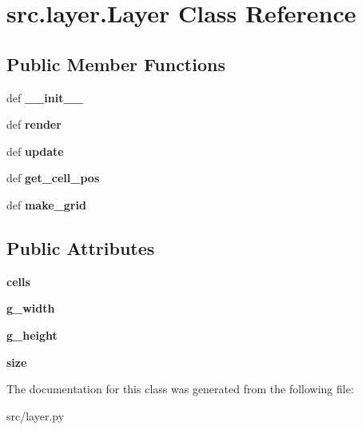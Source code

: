 \hypertarget{classsrc_1_1layer_1_1_layer}{\section{src.\-layer.\-Layer \-Class \-Reference}
\label{classsrc_1_1layer_1_1_layer}
}
\subsection*{\-Public \-Member \-Functions}
\begin{DoxyCompactItemize}
\item 
\hypertarget{classsrc_1_1layer_1_1_layer_a137dd7de61769f9f7f0f0cc57bdb2b00}{def {\bfseries \-\_\-\-\_\-init\-\_\-\-\_\-}}\label{classsrc_1_1layer_1_1_layer_a137dd7de61769f9f7f0f0cc57bdb2b00}

\item 
\hypertarget{classsrc_1_1layer_1_1_layer_a31ca33b8eba527ee2f50cb8c2c58a0f0}{def {\bfseries render}}\label{classsrc_1_1layer_1_1_layer_a31ca33b8eba527ee2f50cb8c2c58a0f0}

\item 
\hypertarget{classsrc_1_1layer_1_1_layer_a9ee40e5e48252fc2f86d41ecce639796}{def {\bfseries update}}\label{classsrc_1_1layer_1_1_layer_a9ee40e5e48252fc2f86d41ecce639796}

\item 
\hypertarget{classsrc_1_1layer_1_1_layer_ab7de06d6087fe89e3db18795777d2c03}{def {\bfseries get\-\_\-cell\-\_\-pos}}\label{classsrc_1_1layer_1_1_layer_ab7de06d6087fe89e3db18795777d2c03}

\item 
\hypertarget{classsrc_1_1layer_1_1_layer_aa173e4625a648a7c774aa9f6c8fb4e65}{def {\bfseries make\-\_\-grid}}\label{classsrc_1_1layer_1_1_layer_aa173e4625a648a7c774aa9f6c8fb4e65}

\end{DoxyCompactItemize}
\subsection*{\-Public \-Attributes}
\begin{DoxyCompactItemize}
\item 
\hypertarget{classsrc_1_1layer_1_1_layer_adcc71aa60154f088a91e05778c2ec1d7}{{\bfseries cells}}\label{classsrc_1_1layer_1_1_layer_adcc71aa60154f088a91e05778c2ec1d7}

\item 
\hypertarget{classsrc_1_1layer_1_1_layer_a1177ea9bed88fb367c91bad8f7a4a384}{{\bfseries g\-\_\-width}}\label{classsrc_1_1layer_1_1_layer_a1177ea9bed88fb367c91bad8f7a4a384}

\item 
\hypertarget{classsrc_1_1layer_1_1_layer_a75f33b5f040b34e7c794e391cef7c5f8}{{\bfseries g\-\_\-height}}\label{classsrc_1_1layer_1_1_layer_a75f33b5f040b34e7c794e391cef7c5f8}

\item 
\hypertarget{classsrc_1_1layer_1_1_layer_abfd5920bd67e111cfdf53262bb6ee491}{{\bfseries size}}\label{classsrc_1_1layer_1_1_layer_abfd5920bd67e111cfdf53262bb6ee491}

\end{DoxyCompactItemize}


\-The documentation for this class was generated from the following file\-:\begin{DoxyCompactItemize}
\item 
src/layer.\-py\end{DoxyCompactItemize}
